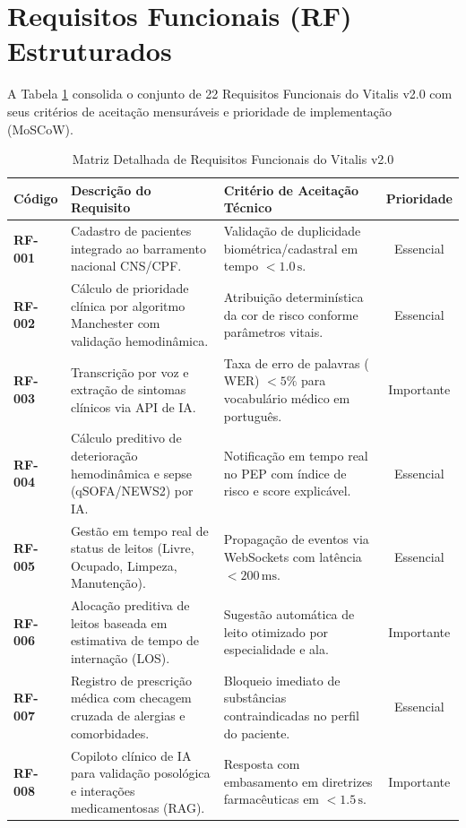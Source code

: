 \documentclass[12pt,oneside,a4paper,article]{abntex2}
\begin{document}
\section{Requisitos Funcionais (RF) Estruturados}
A Tabela \ref{tab:rf} consolida o conjunto de 22 Requisitos Funcionais do Vitalis v2.0 com seus critérios de aceitação mensuráveis e prioridade de implementação (MoSCoW).
\begin{table}[htb]
\centering
\small
\caption{Matriz Detalhada de Requisitos Funcionais do Vitalis v2.0}
\label{tab:rf}
\begin{tabularx}{\textwidth}{l p{5.2cm} p{6.5cm} c}
\toprule
\textbf{Código} & \textbf{Descrição do Requisito} & \textbf{Critério de Aceitação Técnico} & \textbf{Prioridade} \\
\midrule
\textbf{RF-001} & Cadastro de pacientes integrado ao barramento nacional CNS/CPF. & Validação de duplicidade biométrica/cadastral em tempo $< 1.0\,\text{s}$. & Essencial \\
\textbf{RF-002} & Cálculo de prioridade clínica por algoritmo Manchester com validação hemodinâmica. & Atribuição determinística da cor de risco conforme parâmetros vitais. & Essencial \\
\textbf{RF-003} & Transcrição por voz e extração de sintomas clínicos via API de IA. & Taxa de erro de palavras ($\text{WER}$) $< 5\%$ para vocabulário médico em português. & Importante \\
\textbf{RF-004} & Cálculo preditivo de deterioração hemodinâmica e sepse (qSOFA/NEWS2) por IA. & Notificação em tempo real no PEP com índice de risco e score explicável. & Essencial \\
\textbf{RF-005} & Gestão em tempo real de status de leitos (Livre, Ocupado, Limpeza, Manutenção). & Propagação de eventos via WebSockets com latência $< 200\,\text{ms}$. & Essencial \\
\textbf{RF-006} & Alocação preditiva de leitos baseada em estimativa de tempo de internação (LOS). & Sugestão automática de leito otimizado por especialidade e ala. & Importante \\
\textbf{RF-007} & Registro de prescrição médica com checagem cruzada de alergias e comorbidades. & Bloqueio imediato de substâncias contraindicadas no perfil do paciente. & Essencial \\
\textbf{RF-008} & Copiloto clínico de IA para validação posológica e interações medicamentosas (RAG). & Resposta com embasamento em diretrizes farmacêuticas em $< 1.5\,\text{s}$. & Importante \\

\end{tabularx}
\end{table}
\end{document}

